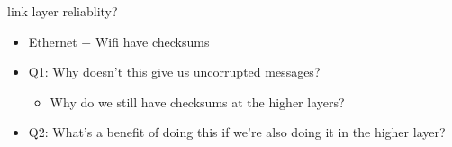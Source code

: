 \begin{frame}{link layer reliablity?}
    \begin{itemize}
    \item Ethernet + Wifi have checksums
    \vspace{.5cm}
    \item Q1: Why doesn't this give us uncorrupted messages?
        \begin{itemize}
        \item Why do we still have checksums at the higher layers?
        \end{itemize}
    \item Q2: What's a benefit of doing this if we're also doing it in the higher layer?
    \end{itemize}
\end{frame}
